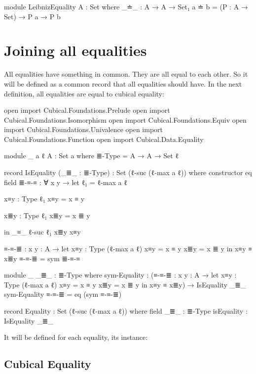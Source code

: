 \documentclass{article}
\begin{document}
\begin{code}
module LeibnizEquality {A : Set} where
  _≐_ : A → A → Set₁
  a ≐ b = (P : A → Set) → P a → P b
\end{code}

\section{Joining all equalities}

All equalities have something in common. They are all equal to each other.
So it will be defined as a common record that all equalities should have.
In the next definition, all equalities are equal to cubical equality:

\begin{code}

open import Cubical.Foundations.Prelude
open import Cubical.Foundations.Isomorphism
open import Cubical.Foundations.Equiv
open import Cubical.Foundations.Univalence
open import Cubical.Foundations.Function
open import Cubical.Data.Equality

module _ {a ℓ} {A : Set a} where
  ≣-Type = A → A → Set ℓ

  record IsEquality (_≣_ : ≣-Type) : Set (ℓ-suc (ℓ-max a ℓ)) where
    constructor eq
    field
      ≣-≡-≡ : ∀ {x y} → let
        ℓ₁ = ℓ-max a ℓ

        x≡y : Type ℓ₁
        x≡y = x ≡ y

        x≣y : Type ℓ₁
        x≣y = x ≣ y

        in _≡_ {ℓ-suc ℓ₁} x≣y x≡y

    ≡-≡-≣ : {x y : A} → let
      x≡y : Type (ℓ-max a ℓ)
      x≡y = x ≡ y
      x≣y = x ≣ y
      in x≡y ≡ x≣y
    ≡-≡-≣ = sym ≣-≡-≡

  module _ {_≣_ : ≣-Type} where
    sym-Equality : (≡-≡-≣ : {x y : A} → let
      x≡y : Type (ℓ-max a ℓ)
      x≡y = x ≡ y
      x≣y = x ≣ y
      in x≡y ≡ x≣y)
      → IsEquality _≣_
    sym-Equality ≡-≡-≣ = eq (sym ≡-≡-≣)

  record Equality : Set (ℓ-suc (ℓ-max a ℓ)) where
    field
      _≣_ : ≣-Type
      isEquality : IsEquality _≣_
\end{code}

It will be defined for each equality, its instance:

\subsection{Cubical Equality}
\end{document}

